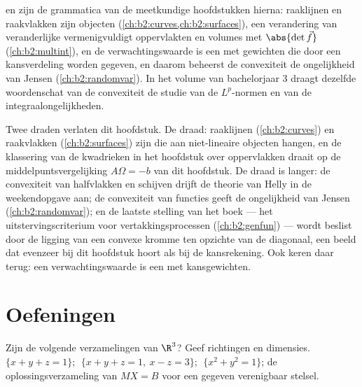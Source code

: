 \begin{remark}
 en  zijn de grammatica van de
meetkundige hoofdstukken hierna: raaklijnen en raakvlakken zijn
 objecten (\cref{ch:b2:curves,ch:b2:surfaces}), een 
verandering van veranderlijke vermenigvuldigt oppervlakten en
volumes met $\abs{\det \vec f}$ (\cref{ch:b2:multint}), en de
verwachtingswaarde is een  met gewichten die door een
kansverdeling worden gegeven, en daarom beheerst de convexiteit de
ongelijkheid van Jensen (\cref{ch:b2:randomvar}). In het volume van
bachelorjaar 3 draagt dezelfde woordenschat van de convexiteit de
studie van de $L^p$-normen en van de integraalongelijkheden.
\end{remark}

\begin{remark}
Twee draden verlaten dit hoofdstuk. De \emph{} draad:
raaklijnen (\cref{ch:b2:curves}) en raakvlakken
(\cref{ch:b2:surfaces}) zijn  die aan
niet-lineaire objecten hangen, en de klassering van de kwadrieken
in het hoofdstuk over oppervlakken draait op de
middelpuntsvergelijking $A\Omega = -b$ van dit hoofdstuk. De
\emph{} draad is langer: de convexiteit van halfvlakken en
schijven drijft de theorie van Helly in de weekendopgave aan; de
convexiteit van functies geeft de ongelijkheid van Jensen
(\cref{ch:b2:randomvar}); en de laatste stelling van het boek ---
het uitstervingscriterium voor vertakkingsprocessen
(\cref{ch:b2:genfun}) --- wordt beslist door de ligging van een
convexe kromme ten opzichte van de diagonaal, een beeld dat evenzeer
bij dit hoofdstuk hoort als bij de kansrekening. Ook 
keren daar terug: een verwachtingswaarde is een  met
kansgewichten.
\end{remark}

\section{Oefeningen}

\begin{exercise}[$\star$]\label{exo:b2:affine:1}
Zijn de volgende verzamelingen  van $\R^3$? Geef
richtingen en dimensies. $\{x + y + z = 1\}$; $\;\{x + y + z = 1,\
x - z = 3\}$; $\;\{x^2 + y^2 = 1\}$; de oplossingsverzameling van
$MX = B$ voor een gegeven verenigbaar stelsel.
\end{exercise}

